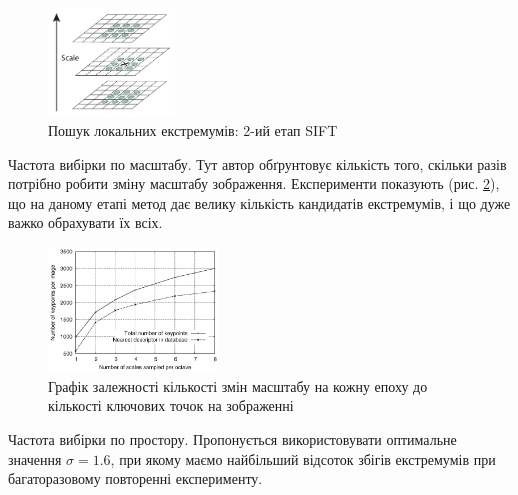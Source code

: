 \begin{enumerate}
          \begin{figure}[H]
              \centering
              \includegraphics[width=0.3\textwidth]{images/sift2}
              \caption{Пошук локальних екстремумів: 2-ий етап SIFT \cite{bib:sift}
                  \label{fig:swift2}
              }
          \end{figure}

          \subitem Частота вибірки по масштабу. Тут автор обґрунтовує кількість того,
          скільки разів потрібно робити зміну масштабу зображення.
          Експерименти показують (рис. \ref{fig:swift3}),
          що на даному етапі метод дає велику кількість кандидатів екстремумів,
          і що дуже важко обрахувати їх всіх.

          \begin{figure}[H]
              \centering
              \includegraphics[width=0.4\textwidth]{images/sift3}
              \caption{Графік залежності кількості змін масштабу на кожну епоху до
                  кількості ключових точок на зображенні \cite{bib:sift}
                  \label{fig:swift3}
              }
          \end{figure}
          \subitem Частота вибірки по простору. Пропонується використовувати оптимальне значення
          $\sigma = 1.6$, при якому
          маємо найбільший відсоток збігів екстремумів при багаторазовому повторенні
          експерименту.


\end{enumerate}
